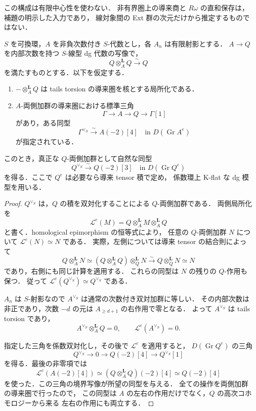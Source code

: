 この構成は有限中心性を使わない．
非有界圏上の導来商と $R\omega$ の直和保存は，補題の明示した入力であり，
線対象間の Ext 群の次元だけから推定するものではない．


\begin{lemma}
\label{lem:serre-dg-homological-epimorphism}
$S$ を可換環，$A$ を非負次数付き $S$-代数とし，各 $A_n$ は有限射影とする．
$A\to Q$ を内部次数を持つ $S$-線型 dg 代数の写像で，
\[
 Q\otimes_A^{\mathbf L}Q\xrightarrow{\sim}Q
\]
を満たすものとする．以下を仮定する．
\begin{enumerate}
\item $-\otimes_A^{\mathbf L}Q$ は tails torsion の導来圏を核とする局所化である．
\item $A$-両側加群の導来圏における標準三角
\[
 \Gamma\longrightarrow A\longrightarrow Q\longrightarrow\Gamma[1]
\]
があり，ある同型
\[
 \Gamma^{\vee_S}\xrightarrow{\sim}A(-2)[4]
 \quad\text{in }D(\operatorname{Gr}A^e)
\]
が指定されている．
\end{enumerate}
このとき，真正な $Q$-両側加群として自然な同型
\begin{equation}\label{eq:serre-localization-dual-bimodule}
 Q^{\vee_S}\xrightarrow{\sim}Q(-2)[3]
 \quad\text{in }D(\operatorname{Gr}Q^e)
\end{equation}
を得る．ここで $Q^e$ は必要なら導来 tensor 積で定め，
係数環上 K-flat な dg 模型を用いる．
\end{lemma}

\begin{proof}
$Q^{\vee_S}$ は，$Q$ の積を双対化することによる $Q$-両側加群である．
両側局所化を
\[
 \mathcal L^e(M)=Q\otimes_A^{\mathbf L}M\otimes_A^{\mathbf L}Q
\]
と書く．homological epimorphism の恒等式により，
任意の $Q$-両側加群 $N$ について
$\mathcal L^e(N)\simeq N$ である．
実際，左側については導来 tensor の結合則によって
\[
 Q\otimes_A^{\mathbf L}N
 \simeq(Q\otimes_A^{\mathbf L}Q)\otimes_Q^{\mathbf L}N
 \xrightarrow{\sim}Q\otimes_Q^{\mathbf L}N\simeq N
\]
であり，右側にも同じ計算を適用する．
これらの同型は $N$ の残りの $Q$-作用も保つ．
従って $\mathcal L^e(Q^{\vee_S})\simeq Q^{\vee_S}$ である．

$A_n$ は $S$-射影なので $A^{\vee_S}$ は通常の次数付き双対加群に等しい．
その内部次数は非正であり，次数 $-d$ の元は $A_{\geq d+1}$ の右作用で零となる．
よって $A^{\vee_S}$ は tails torsion であり，
\[
 A^{\vee_S}\otimes_A^{\mathbf L}Q=0,
 \qquad\mathcal L^e(A^{\vee_S})=0.
\]

指定した三角を係数双対化し，その後で $\mathcal L^e$ を適用すると，
$D(\operatorname{Gr}Q^e)$ の三角
\[
 Q^{\vee_S}\longrightarrow0\longrightarrow
 Q(-2)[4]\longrightarrow Q^{\vee_S}[1]
\]
を得る．最後の非零項では
\[
 \mathcal L^e(A(-2)[4])
 \simeq(Q\otimes_A^{\mathbf L}Q)(-2)[4]
 \simeq Q(-2)[4]
\]
を使った．この三角の境界写像が所望の同型を与える．
全ての操作を両側加群の導来圏で行ったので，
この同型は $A$ の左右の作用だけでなく，$Q$ の高次コホモロジーから来る
左右の作用にも両立する．
\end{proof}

